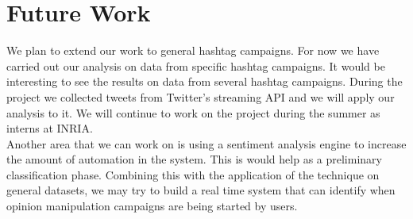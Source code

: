 \documentclass[journal, a4paper, 12pt]{article}
\begin{document}
\section{Future Work}

We plan to extend our work to general hashtag campaigns. For now we have carried out our analysis on data from specific hashtag campaigns. It would be interesting to see the results on data from several hashtag campaigns. During the project we collected tweets from Twitter's streaming API and we will apply our analysis to it. We will continue to work on the project during the summer as interns at INRIA. \\

Another area that we can work on is using a sentiment analysis engine to increase the amount of automation in the system. This is would help as a preliminary classification phase. Combining this with the application of the technique on general datasets, we may try to build a real time system that can identify when opinion manipulation campaigns are being started by users.
\end{document}
